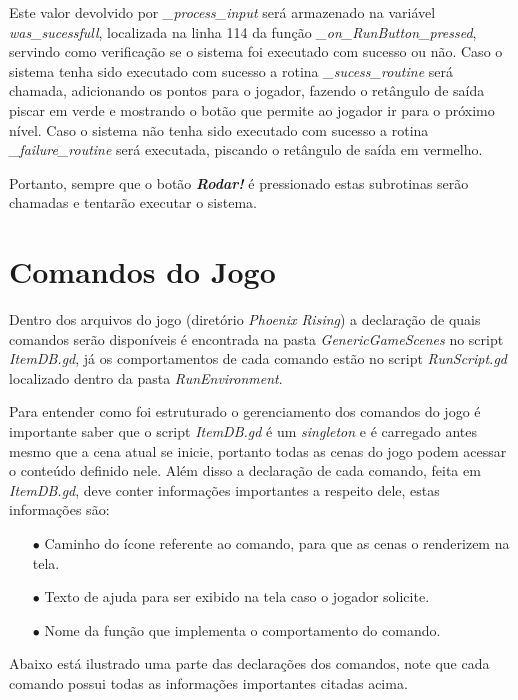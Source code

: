 Este valor devolvido por \textit{\_process\_input} será armazenado na variável 
\textit{was\_sucessfull}, localizada na linha 114 da função 
\textit{\_on\_RunButton\_pressed}, servindo como verificação se o sistema foi 
executado com sucesso ou não. Caso o sistema tenha sido executado com sucesso a
rotina \textit{\_sucess\_routine} será chamada, adicionando os pontos para o
jogador, fazendo o retângulo de saída piscar em verde e mostrando o botão que 
permite ao jogador ir para o próximo nível. Caso o sistema não tenha sido 
executado com sucesso a rotina \textit{\_failure\_routine} será executada,
piscando o retângulo de saída em vermelho.

Portanto, sempre que o botão \textbf{\textit{Rodar!}} é pressionado estas 
subrotinas serão chamadas e tentarão executar o sistema.

\section{Comandos do Jogo}

Dentro dos arquivos do jogo (diretório \textit{Phoenix Rising}) a declaração 
de quais comandos serão disponíveis é encontrada na pasta 
\textit{GenericGameScenes} no script \textit{ItemDB.gd}, já os comportamentos 
de cada comando estão no script \textit{RunScript.gd} localizado dentro da
pasta \textit{RunEnvironment}.

Para entender como foi estruturado o gerenciamento dos comandos do jogo é 
importante saber que o script \textit{ItemDB.gd} é um \textit{singleton} e é 
carregado antes mesmo que a cena atual se inicie, portanto todas as cenas do 
jogo podem acessar o conteúdo definido nele. Além disso a declaração de cada
comando, feita em \textit{ItemDB.gd}, deve conter 
informações importantes a respeito dele, estas informações são:

\begin{itemize}
    \item[$\bullet$]
        Caminho do ícone referente ao comando, para que as cenas o renderizem
        na tela.
    \item[$\bullet$]
        Texto de ajuda para ser exibido na tela caso o jogador solicite.
    \item[$\bullet$]
        Nome da função que implementa o comportamento do comando.
\end{itemize}

Abaixo está ilustrado uma parte das declarações dos comandos, note que
cada comando possui todas as informações importantes citadas acima.

